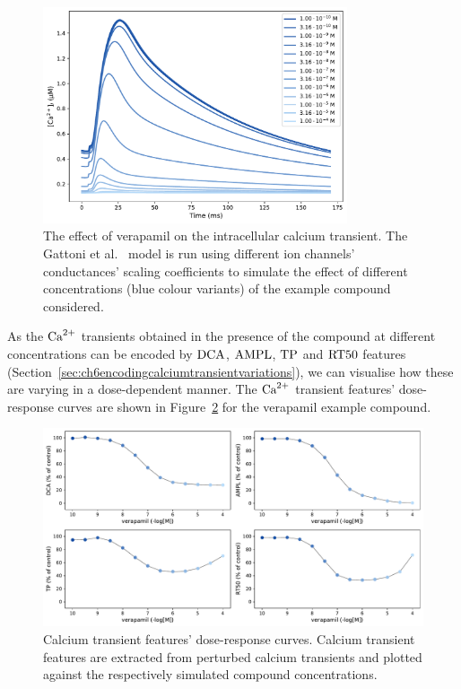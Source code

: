 \begin{figure}[!ht]
    \myfloatalign
    \includegraphics[width=0.8\textwidth]{figures/chapter06/verapamil_calcium_curve_drug.pdf}
    \caption{The effect of verapamil on the intracellular calcium transient. The Gattoni et al.~\cite{Gattoni:2017} model is run using different ion channels' conductances' scaling coefficients to simulate the effect of different concentrations (blue colour variants) of the example compound considered.}
    \label{fig:calciumverapamil}
\end{figure}

\vspace{0.2cm}
As the $\textrm{Ca}^{2+}$ transients obtained in the presence of the compound at different concentrations can be encoded by $\textrm{DCA}$, $\textrm{AMPL}$, $\textrm{TP}$ and $\textrm{RT50}$ features (Section~\ref{sec:ch6encodingcalciumtransientvariations}), we can visualise how these are varying in a dose-dependent manner. The $\textrm{Ca}^{2+}$ transient features' dose-response curves are shown in Figure~\ref{fig:cafeatsverapamilrespcurve} for the verapamil example compound.

\begin{figure}[!ht]
    \myfloatalign
    \includegraphics[width=\textwidth]{figures/chapter06/verapamil_dose_calcium_response_curve_drug.pdf}
    \caption{Calcium transient features' dose-response curves. Calcium transient features are extracted from perturbed calcium transients and plotted against the respectively simulated compound concentrations.}
    \label{fig:cafeatsverapamilrespcurve}
\end{figure}

